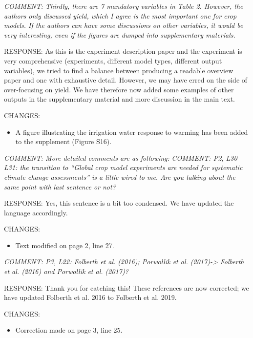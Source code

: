 \documentclass[gmd, manuscript]{copernicus} %
\begin{document}
\smallskip

\textcolor{dark-gray}{\textit{COMMENT: Thirdly, there are 7 mandatory variables in Table 2. However, the authors only discussed yield, which I agree is the most important one for crop models. If the authors can have some discussions on other variables, it would be very interesting, even if the figures are dumped into supplementary materials.}} 

RESPONSE: As this is the experiment description paper and the experiment is very comprehensive (experiments, different model types, different output variables), we tried to find a balance between producing a readable overview paper and one with exhaustive detail. However, we may have erred on the side of over-focusing on yield. We have therefore now added some examples of other outputs in the supplementary material and more discussion in the main text.
\smallskip

CHANGES:
\begin{itemize}
    \item A figure illustrating the irrigation water response to warming has been added to the supplement (Figure S16).
\end{itemize}

\smallskip

\textcolor{dark-gray}{\textit{COMMENT: More detailed comments are as following:}}
\textcolor{dark-gray}{\textit{COMMENT: P2, L30-L31: the transition to “Global crop model experiments are needed for systematic climate change assessments” is a little wired to me. Are you talking about the same point with last sentence or not?}}

RESPONSE: Yes, this sentence is a bit too condensed. We have updated the language accordingly. 
\smallskip

CHANGES:
\begin{itemize}
    \item Text modified on page 2, line 27.
\end{itemize}

\smallskip

\textcolor{dark-gray}{\textit{COMMENT: P3, L22: Folberth et al. (2016); Porwollik et al. (2017)-> Folberth et al. (2016) and Porwollik et al. (2017)?}}

RESPONSE: Thank you for catching this! These references are now corrected; we have updated Folberth et al. 2016 to Folberth et al. 2019.
\smallskip

CHANGES:
\begin{itemize}
    \item Correction made on page 3, line 25.
\end{itemize}
\end{document}
